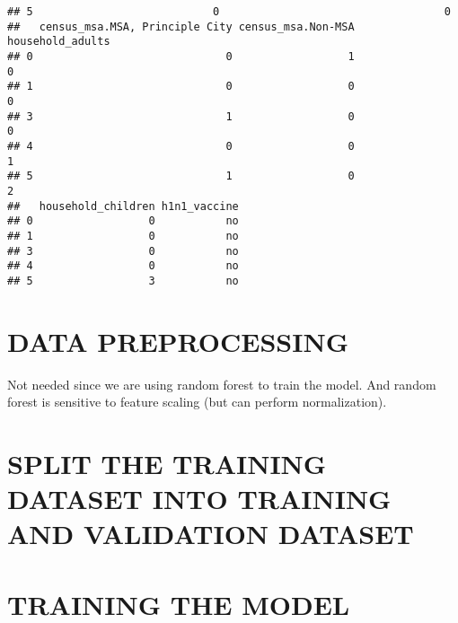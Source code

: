 \documentclass[
]{article}
\newenvironment{Shaded}{\begin{snugshade}}{\end{snugshade}}
\newcommand{\AttributeTok}[1]{\textcolor[rgb]{0.13,0.29,0.53}{#1}}
\newcommand{\CommentTok}[1]{\textcolor[rgb]{0.56,0.35,0.01}{\textit{#1}}}
\newcommand{\ConstantTok}[1]{\textcolor[rgb]{0.56,0.35,0.01}{#1}}
\newcommand{\DecValTok}[1]{\textcolor[rgb]{0.00,0.00,0.81}{#1}}
\newcommand{\FloatTok}[1]{\textcolor[rgb]{0.00,0.00,0.81}{#1}}
\newcommand{\FunctionTok}[1]{\textcolor[rgb]{0.13,0.29,0.53}{\textbf{#1}}}
\newcommand{\NormalTok}[1]{#1}
\newcommand{\OtherTok}[1]{\textcolor[rgb]{0.56,0.35,0.01}{#1}}
\newcommand{\SpecialCharTok}[1]{\textcolor[rgb]{0.81,0.36,0.00}{\textbf{#1}}}
\begin{document}
\begin{verbatim}
## 5                            0                                   0
##   census_msa.MSA, Principle City census_msa.Non-MSA household_adults
## 0                              0                  1                0
## 1                              0                  0                0
## 3                              1                  0                0
## 4                              0                  0                1
## 5                              1                  0                2
##   household_children h1n1_vaccine
## 0                  0           no
## 1                  0           no
## 3                  0           no
## 4                  0           no
## 5                  3           no
\end{verbatim}

\section{DATA PREPROCESSING}\label{data-preprocessing}

Not needed since we are using random forest to train the model. And
random forest is sensitive to feature scaling (but can perform
normalization).

\section{SPLIT THE TRAINING DATASET INTO TRAINING AND VALIDATION
DATASET}\label{split-the-training-dataset-into-training-and-validation-dataset}

\begin{Shaded}
\end{Shaded}

\section{TRAINING THE MODEL}\label{training-the-model}
\end{document}
